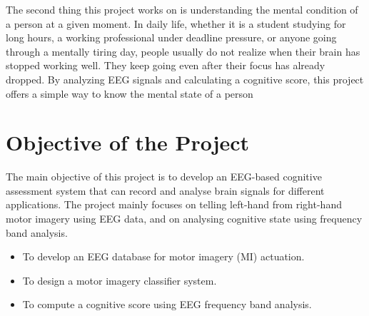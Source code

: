 The second thing this project works on is understanding the mental condition of a person at a given moment. In daily life, whether it is a student studying for long hours, a working professional under deadline pressure, or anyone going through a mentally tiring day, people usually do not realize when their brain has stopped working well. They keep going even after their focus has already dropped. By analyzing EEG signals and calculating a cognitive score, this project offers a simple way to know the mental state of a person



\section{Objective of the Project}

The main objective of this project is to develop an EEG-based cognitive assessment system that can record and analyse brain signals for different applications. The project mainly focuses on telling left-hand from right-hand motor imagery using EEG data, and on analysing cognitive state using frequency band analysis.\\

\begin{itemize}[topsep=2pt, itemsep=4pt]
    \item To develop an EEG database for motor imagery (MI) actuation.

    \item To design a motor imagery classifier system.

    \item To compute a cognitive score using EEG frequency band analysis.
\end{itemize}
